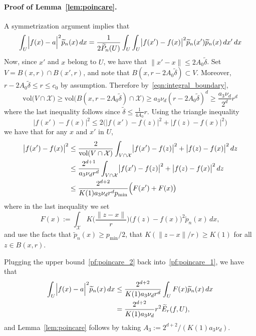 \documentclass[twoside]{article}
\newcommand{\vol}{\text{vol}}
\newcommand{\1}{\mathbf{1}}
\newcommand{\Xset}{\mathcal{X}}
\newcommand{\mc}[1]{\mathcal{#1}}
\newcommand{\wt}[1]{\widetilde{#1}}
\theoremstyle{definition}
\theoremstyle{remark}
\begin{document}
\paragraph{Proof of Lemma~\ref{lem:poincare}.}
A symmetrization argument implies that
\begin{equation}
\label{pf:poincare_1}
\int_{U} \Bigl|f(x)-a\Bigr|^2 \wt{p}_n(x)\,dx = \frac{1}{2\wt{P}_n(U)} \int_{U} \int_{U} \bigl|f(x') - f(x)\bigr|^2 \wt{p}_n(x') \wt{p}_n(x) \,dx' \,dx
\end{equation}
Now, since $x'$ and $x$ belong to $U$, we have that $\|x' - x\| \leq 2A_0\wt{\delta}$. Set $V = B(x,r) \cap B(x',r)$, and note that $B(x,r - 2A_0\wt{\delta}) \subset V$. Moreover, $r - 2A_0\wt{\delta} \leq r \leq c_0$ by assumption. Therefore by~\eqref{eqn:integral_boundary},
\begin{equation*}
\vol\bigl(V \cap \Xset\bigr) \geq \vol\bigl(B(x,r - 2A_0\wt{\delta}) \cap \mc{X}\bigr) \geq a_3 \nu_d (r - 2A_0\wt{\delta})^d \geq \frac{a_3 \nu_d}{2^d}r^d 
\end{equation*}
where the last inequality follows since $\wt{\delta} \leq \frac{1}{4A_0}r$. Using the triangle inequality 
\begin{equation*}
\bigl|f(x') - f(x)\big|^2 \leq 2\bigl(\bigl|f(x') - f(z)\big|^2 + \bigl|f(z) - f(x)\big|^2\bigr)
\end{equation*}
we have that for any $x$ and $x'$ in $U$,
\begin{align}
\bigl|f(x') - f(x)\big|^2 & \leq \frac{2}{\vol(V \cap \Xset)} \int_{V \cap \Xset} \bigl|f(x') - f(z)\big|^2 + \bigl|f(z) - f(x)\big|^2 \,dz \nonumber \\
& \leq \frac{2^{d + 1}}{a_3 \nu_d r^d} \int_{V \cap \Xset} \bigl|f(x') - f(z)\big|^2 + \bigl|f(z) - f(x)\big|^2 \,dz \nonumber \\
& \leq \frac{2^{d + 2}}{K(1) a_3 \nu_d r^d p_{\min}} \Bigl(F(x') + F(x)\bigr) \label{pf:poincare_2}
\end{align}
where in the last inequality we set
\begin{equation*}
F(x) := \int_{\Xset} K\biggl(\frac{\|z - x\|}{r}\biggr) \bigl(f(z) - f(x)\bigr)^2 \wt{p}_n(x) \,dx,
\end{equation*}
and use the facts that $\wt{p}_n(x) \geq p_{\min}/2$, that $K(\|z  - x\|/r) \geq K(1)$ for all $z \in B(x,r)$. 

Plugging the upper bound~\eqref{pf:poincare_2} back into~\eqref{pf:poincare_1}, we have that
\begin{align*}
\int_{U} \Bigl|f(x)-a\Bigr|^2 \wt{p}_n(x)\,dx & \leq \frac{2^{d + 2}}{K(1) a_3 \nu_d r^d} \int_{U} F(x)\wt{p}_n(x) \,dx \\
& = \frac{2^{d + 2}}{K(1) a_3 \nu_d}r^2 \wt{E}_r(f,U),
\end{align*}
and Lemma~\ref{lem:poincare} follows by taking $A_3 := 2^{d + 2}/(K(1) a_3 \nu_d)$.
\end{document}
